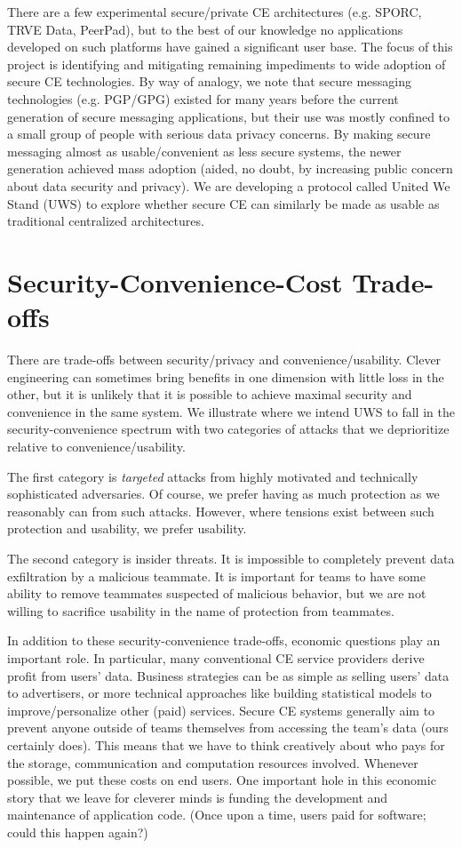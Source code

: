 \documentclass{article}
\begin{document}
There are a few experimental secure/private CE architectures (e.g. SPORC, TRVE Data, PeerPad), but to the best of our knowledge no applications developed on such platforms have gained a significant user base.
The focus of this project is identifying and mitigating remaining impediments to wide adoption of secure CE technologies.
By way of analogy, we note that secure messaging technologies (e.g. PGP/GPG) existed for many years before the current generation of secure messaging applications, but their use was mostly confined to a small group of people with serious data privacy concerns.
By making secure messaging almost as usable/convenient as less secure systems, the newer generation achieved mass adoption (aided, no doubt, by increasing public concern about data security and privacy).
We are developing a protocol called United We Stand (UWS) to explore whether secure CE can similarly be made as usable as traditional centralized architectures.

\section{Security-Convenience-Cost Trade-offs}

There are trade-offs between security/privacy and convenience/usability.
Clever engineering can sometimes bring benefits in one dimension with little loss in the other, but it is unlikely that it is possible to achieve maximal security and convenience in the same system.
We illustrate where we intend UWS to fall in the security-convenience spectrum with two categories of attacks that we deprioritize relative to convenience/usability.

The first category is \emph{targeted} attacks from highly motivated and technically sophisticated adversaries.
Of course, we prefer having as much protection as we reasonably can from such attacks.
However, where tensions exist between such protection and usability, we prefer usability.

The second category is insider threats.
It is impossible to completely prevent data exfiltration by a malicious teammate.
It is important for teams to have some ability to remove teammates suspected of malicious behavior, but we are not willing to sacrifice usability in the name of protection from teammates.

In addition to these security-convenience trade-offs, economic questions play an important role.
In particular, many conventional CE service providers derive profit from users' data.
Business strategies can be as simple as selling users' data to advertisers, or more technical approaches like building statistical models to improve/personalize other (paid) services.
Secure CE systems generally aim to prevent anyone outside of teams themselves from accessing the team's data (ours certainly does).
This means that we have to think creatively about who pays for the storage, communication and computation resources involved.
Whenever possible, we put these costs on end users.
One important hole in this economic story that we leave for cleverer minds is funding the development and maintenance of application code.
(Once upon a time, users paid for software; could this happen again?)
\end{document}
